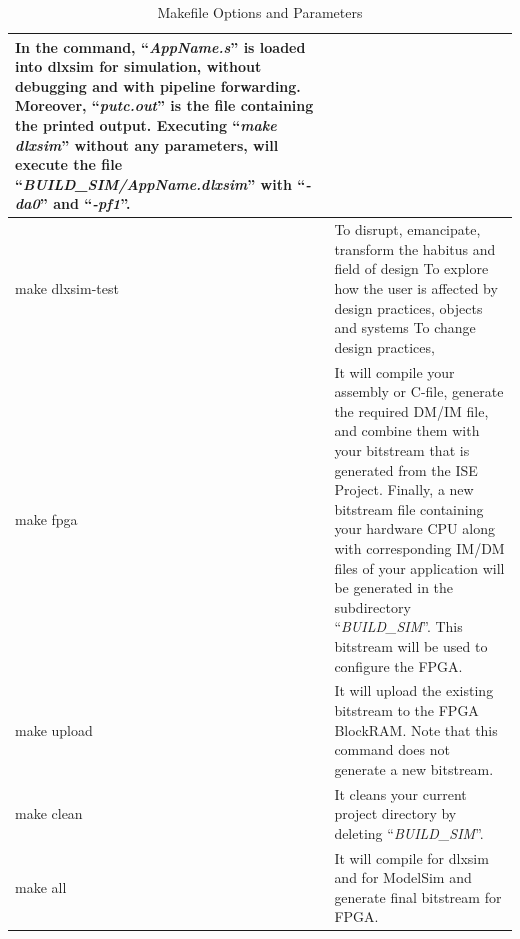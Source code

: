 \begin{table}[!htb]
\begin{tabular}{|l|p{13cm}|}
		In the command, ``\emph{AppName.s}'' is loaded into dlxsim for
		simulation, without debugging and with pipeline forwarding. Moreover,
		``\emph{putc.out}'' is the file containing the printed output. Executing
		``\emph{make dlxsim}'' without any parameters, will execute the file
		``\emph{BUILD\_SIM/AppName.dlxsim}'' with ``\emph{-da0}'' and
		``\emph{-pf1}''.\strut  \\\hline
		make dlxsim-test        
		& To disrupt, emancipate, transform the habitus and field of design To explore how the user is affected by design practices, objects and systems To change design practices, \\\hline
		make fpga &       
		It will compile your assembly or C-file, generate the
		required DM/IM file, and combine them with your bitstream that is
		generated from the ISE Project. Finally, a new bitstream file containing
		your hardware CPU along with corresponding IM/DM files of your
		application will be generated in the subdirectory ``\emph{BUILD\_SIM}''.
		This bitstream will be used to configure the FPGA. \\ \hline
		make upload &        
		It will upload the existing bitstream to the FPGA
		BlockRAM. Note that this command does not generate a new
		bitstream. \\ \hline
		make clean &       
		It cleans your current project directory by deleting
		``\emph{BUILD\_SIM}''. \\	\hline
		make all &       
		It will compile for dlxsim and for ModelSim and generate
		final bitstream for FPGA. \\	\hline
	\end{tabular}
	\caption{Makefile Options and Parameters}
\label{fig:fig22}
\end{table}
